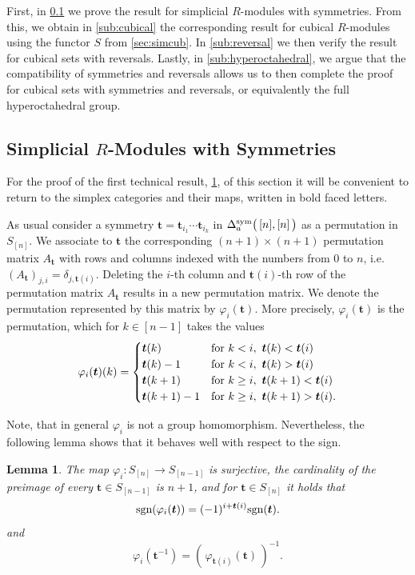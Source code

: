\documentclass[12pt]{amsart}
\theoremstyle{plain}
\newtheorem{lemma}{Lemma}
\numberwithin{lemma}{\DefaultNumberTheoremWithin}
\numberwithin{claim}{\DefaultNumberTheoremWithin}
\numberwithin{theorem}{\DefaultNumberTheoremWithin}
\numberwithin{corollary}{\DefaultNumberTheoremWithin}
\numberwithin{proposition}{\DefaultNumberTheoremWithin}
\numberwithin{conjecture}{\DefaultNumberTheoremWithin}
\theoremstyle{definition}
\theoremstyle{definition}
\numberwithin{question}{\DefaultNumberTheoremWithin}
\theoremstyle{definition}
\numberwithin{problem}{\DefaultNumberTheoremWithin}
\theoremstyle{remark}
\numberwithin{remark}{\DefaultNumberTheoremWithin}
\theoremstyle{remark}
\numberwithin{example}{\DefaultNumberTheoremWithin}
\def\for{\textnormal{for }}
\def\sgn{\textnormal{sgn}}
\def\Dsym{\Delta^{\textnormal{sym}}_a}
\def\symtowermap{\varphi}
\def\bt{\boldsymbol t}
\newcommand{\Sym}[1]{S_{[#1]}}
\begin{document}
First, in
\ref{sub:simplicial} we prove the result for simplicial $R$-modules with symmetries. From this, we obtain in \ref{sub:cubical} the corresponding result for cubical $R$-modules using the functor $S$ from \ref{sec:simcub}. In \ref{sub:reversal} we then verify the result for cubical sets with reversals. Lastly, in \ref{sub:hyperoctahedral}, we argue that the compatibility of symmetries and reversals allows us to then complete the proof for
cubical sets with symmetries and reversals, or
equivalently the full hyperoctahedral group.


\subsection{Simplicial \texorpdfstring{$R$}--Modules with Symmetries}
\label{sub:simplicial}


For the proof of the first technical result, \ref{dtLemma}, 
of this section it will be
convenient to return to the simplex categories and their maps, written in 
bold faced letters. 

As usual consider a symmetry $\bt=\bt_{i_1}\cdots \bt_{i_k}$ in 
$\Dsym \big(\,[n],[n] \,\big)$ as a permutation in $S_{[n]}$. 
We associate to $\bt$ the corresponding $(n+1)\times (n+1)$ permutation matrix $A_{\bt}$ with rows and columns indexed with the numbers from 
$0$ to $n$, i.e. $(A_{\bt})_{j,i}=\delta_{j,\bt(i)}$. 
Deleting the $i$-th column and $\bt(i)$-th row of the permutation matrix $A_{\bt}$ results in a new permutation matrix. We denote 
the permutation represented by this matrix by $\symtowermap_i(\bt)$. More precisely, $\symtowermap_i(\bt)$ is the permutation, which for $k\in [n-1]$ takes the values
\[
\symtowermap_i(\bt)(k)=\begin{cases}
    \bt(k) & \for k<i, ~\bt(k) <\bt(i)\\
    \bt(k)-1 & \for k<i,~ \bt(k)>\bt(i)\\
    \bt(k+1) & \for k\geq i,~ \bt(k+1)<\bt(i)\\
    \bt(k+1) -1 &\for k\geq i,~\bt(k+1)>\bt(i).
\end{cases}
\]


Note, that in general $\symtowermap_i$ is not a group homomorphism. Nevertheless, the following lemma shows that
it behaves well with respect to the sign.

\begin{lemma}\label{dtLemma}
     The map $\symtowermap_i\colon \Sym{n} 
     \to \Sym{n-1}$ is surjective, the cardinality of the preimage of every $\bt \in \Sym{n-1}$ is $n+1$,
     and for $\bt \in S_{[n]}$ it holds that
    \[
    \sgn(\symtowermap_i(\bt))=(-1)^{i+\bt(i)} \sgn(\bt).
    \]
    and
    \[
    \symtowermap_i(\bt^{-1})=\left(\,\symtowermap_{\bt(i)}(\bt)\,\right)^{-1}.
    \]
\end{lemma}
\end{document}
